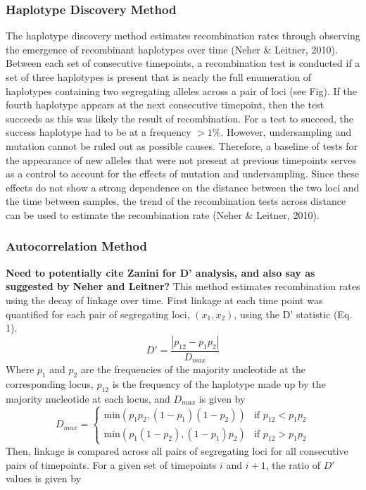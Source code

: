 \documentclass[12pt]{article}
\begin{document}
\subsubsection*{Haplotype Discovery Method}
The haplotype discovery method estimates recombination rates through observing the emergence of recombinant haplotypes over time (Neher \& Leitner, 2010). Between each set of consecutive timepoints, a recombination test is conducted if a set of three haplotypes is present that is nearly the full enumeration of haplotypes containing two segregating alleles across a pair of loci (see Fig). If the fourth haplotype appears at the next consecutive timepoint, then the test succeeds as this was likely the result of recombination. For a test to succeed, the success haplotype had to be at a frequency $>1\%$.  However, undersampling and mutation cannot be ruled out as possible causes. Therefore, a baseline of tests for the appearance of new alleles that were not present at previous timepoints serves as a control to account for the effects of mutation and undersampling. Since these effects do not show a strong dependence on the distance between the two loci and the time between samples, the trend of the recombination tests across distance can be used to estimate the recombination rate (Neher \& Leitner, 2010).

\subsubsection*{Autocorrelation Method}
\textbf{Need to potentially cite Zanini for D' analysis, and also say as suggested by Neher and Leitner?}
    This method estimates recombination rates using the decay of linkage over time. First linkage at each time point was quantified for each pair of segregating loci, $(x_1, x_2)$, using the D’ statistic (Eq. 1). 
 \begin{equation}
 D' = \frac{|p_{12} - p_1p_2|}{D_{max}}
 \end{equation}
     Where $p_1$ and $p_2$ are the frequencies of the majority nucleotide at the corresponding locus, $p_{12}$ is the frequency of the haplotype made up by the majority nucleotide at each locus, and $D_{max}$ is given by
\[
    D_{max} = \begin{cases}
    \text{min}(p_1p_2, (1-p_1)(1-p_2)) & \text{if }p_{12} < p_1p_2\\
    \text{min}(p_1(1-p_2), (1-p_1)p_2) & \text{if }p_{12} > p_1p_2
    \end{cases}
\]
Then, linkage is compared across all pairs of segregating loci for all consecutive pairs of timepoints. For a given set of timepoints $i$ and $i+1$, the ratio of $D'$ values is given by
\end{document}
